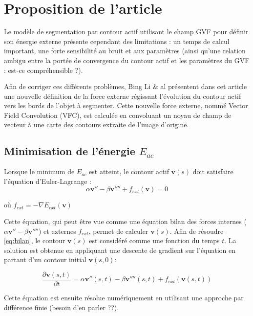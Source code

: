 \documentclass{article}
\begin{document}
\section{Proposition de l'article}

Le modèle de segmentation par contour actif utilisant le champ GVF pour définir son énergie externe présente cependant des limitations : un temps de calcul important, une forte sensibilité au bruit et aux paramètres (ainsi qu'une relation ambigu entre la portée de convergence du contour actif et les paramètres du GVF : est-ce compréhensible ?).

Afin de corriger ces différents problèmes, Bing Li \& al présentent dans cet article une nouvelle définition de la force externe régissant l'évolution du contour actif vers les bords  de l'objet à segmenter. Cette nouvelle force externe, nommé Vector Field Convolution (VFC), est calculée en convoluant un noyau de champ de vecteur à une carte des contours extraite de l'image d'origine.   

\subsection{Minimisation de l'énergie $E_{ac}$}

Lorsque le minimum de $E_{ac}$ est atteint, le contour actif $\mathbf{v}(s)$ doit satisfaire l'équation d'Euler-Lagrange :
\begin{equation}
	\alpha \mathbf{v}'' - \beta \mathbf{v}'''' + f_{ext}(\mathbf{v}) = 0
	\label{eq:bilan}
\end{equation}

où $f_{ext}= - \nabla E_{ext}(\mathbf{v})$

Cette équation, qui peut être vue comme une équation bilan des forces internes ($\alpha \mathbf{v}'' - \beta \mathbf{v}''''$) et externes $f_{ext}$, permet de calculer $\mathbf{v}(s)$. Afin de résoudre \ref{eq:bilan}, le contour $\mathbf{v}(s)$ est considéré comme une fonction du temps $t$. La solution est obtenue en appliquant une descente de gradient sur l'équation en partant d'un contour initial $\mathbf{v}(s,0)$:

\begin{equation}
	\frac{\partial \mathbf{v}(s,t)}{\partial t} = \alpha \mathbf{v}''(s,t) - \beta \mathbf{v}''''(s,t)+f_{ext}(\mathbf{v}(s,t))
	\label{eq:graddesc}
\end{equation}

Cette équation est ensuite résolue numériquement en utilisant une approche par différence finie (besoin d'en parler ??).
\end{document}
